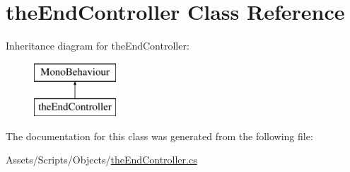 \hypertarget{classthe_end_controller}{}\section{the\+End\+Controller Class Reference}
\label{classthe_end_controller}
Inheritance diagram for the\+End\+Controller\+:\begin{figure}[H]
\begin{center}
\leavevmode
\includegraphics[height=2.000000cm]{classthe_end_controller}
\end{center}
\end{figure}


The documentation for this class was generated from the following file\+:\begin{DoxyCompactItemize}
\item 
Assets/\+Scripts/\+Objects/\mbox{\hyperlink{the_end_controller_8cs}{the\+End\+Controller.\+cs}}\end{DoxyCompactItemize}
